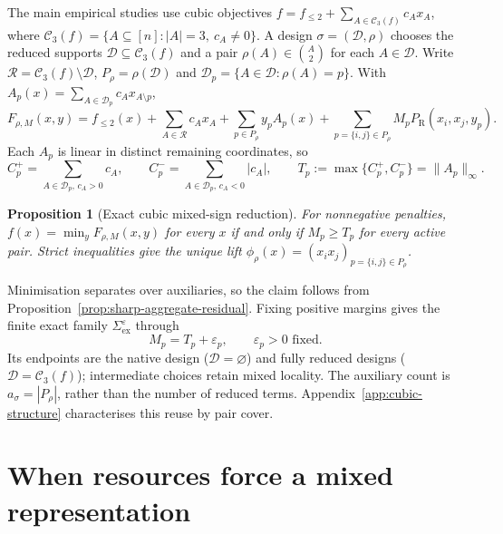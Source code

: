 \documentclass[a4paper,onecolumn,11pt,unpublished]{quantumarticle}
\newtheorem{proposition}[proposition]{Proposition}
\theoremstyle{remark}
\begin{document}
The main empirical studies use cubic objectives
$f=f_{\leq2}+\sum_{A\in\mathcal C_3(f)}c_Ax_A$, where
$\mathcal C_3(f)=\{A\subseteq[n]:|A|=3,\ c_A\neq0\}$.
A design $\sigma=(\mathcal D,\rho)$ chooses the reduced supports
$\mathcal D\subseteq\mathcal C_3(f)$ and a pair
$\rho(A)\in\binom A2$ for each $A\in\mathcal D$.
Write $\mathcal R=\mathcal C_3(f)\setminus\mathcal D$,
$P_\rho=\rho(\mathcal D)$ and
$\mathcal D_p=\{A\in\mathcal D:\rho(A)=p\}$.
With $A_p(x)=\sum_{A\in\mathcal D_p}c_Ax_{A\setminus p}$,
\begin{equation}
F_{\rho,M}(x,y)=f_{\leq2}(x)+\sum_{A\in\mathcal R}c_Ax_A
+\sum_{p\in P_\rho}y_pA_p(x)
+\sum_{p=\{i,j\}\in P_\rho}M_pP_{\mathrm R}(x_i,x_j,y_p).
\label{eq:cubic-mixed-objective}
\end{equation}
Each $A_p$ is linear in distinct remaining coordinates, so
\begin{equation}
C_p^+=\sum_{A\in\mathcal D_p,\,c_A>0}c_A,\qquad
C_p^-=\sum_{A\in\mathcal D_p,\,c_A<0}|c_A|,\qquad
T_p:=\max\{C_p^+,C_p^-\}=\|A_p\|_\infty.
\label{eq:cubic-threshold}
\end{equation}

\begin{proposition}[Exact cubic mixed-sign reduction]
\label{prop:cubic-mixed-sign}
For nonnegative penalties, $f(x)=\min_yF_{\rho,M}(x,y)$ for every $x$
if and only if $M_p\geq T_p$ for every active pair. Strict inequalities give
the unique lift $\phi_\rho(x)=(x_ix_j)_{p=\{i,j\}\in P_\rho}$.
\end{proposition}

Minimisation separates over auxiliaries, so the claim follows from
Proposition~\ref{prop:sharp-aggregate-residual}. Fixing positive margins gives
the finite exact family $\Sigma_{\mathrm{ex}}^\varepsilon$ through
\begin{equation}
M_p=T_p+\varepsilon_p,\qquad \varepsilon_p>0\text{ fixed}.
\label{eq:canonical-cubic-penalty}
\end{equation}
Its endpoints are the native design ($\mathcal D=\varnothing$) and fully
reduced designs ($\mathcal D=\mathcal C_3(f)$); intermediate choices retain
mixed locality. The auxiliary count is $a_\sigma=|P_\rho|$, rather than
the number of reduced terms. Appendix~\ref{app:cubic-structure} characterises
this reuse by pair cover.




\section{When resources force a mixed representation}
\label{sec:representation-phases}
\end{document}
